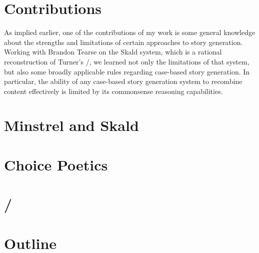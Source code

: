 \section{Contributions}

As implied earlier, one of the contributions of my work is some general knowledge about the strengths and limitations of certain approaches to story generation.
%
Working with Brandon Tearse on the Skald system, which is a rational reconstruction of Turner's \minstrel/, we learned not only the limitations of that system, but also some broadly applicable rules regarding case-based story generation.
%
In particular, the ability of any case-based story generation system to recombine content effectively is limited by its commonsense reasoning capabilities.

\section{Minstrel and Skald}

\section{Choice Poetics}

\section{\dunyazad/}

\section{Outline}
